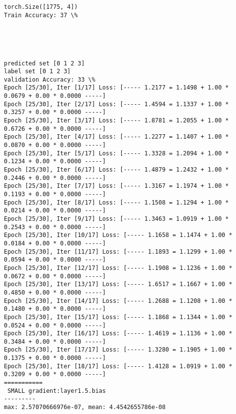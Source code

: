 \documentclass[11pt]{article}
\begin{document}
    \begin{Verbatim}[commandchars=\\\{\}]
torch.Size([1775, 4])
Train Accuracy: 37 \%

    \end{Verbatim}

    \begin{center}
    \end{center}
    { \hspace*{\fill} \\}
    
    \begin{center}
    \end{center}
    { \hspace*{\fill} \\}
    
    \begin{Verbatim}[commandchars=\\\{\}]
predicted set [0 1 2 3]
label set [0 1 2 3]
validation Accuracy: 33 \%
Epoch [25/30], Iter [1/17] Loss: [----- 1.2177 = 1.1498 + 1.00 * 0.0679 + 0.00 * 0.0000 -----]
Epoch [25/30], Iter [2/17] Loss: [----- 1.4594 = 1.1337 + 1.00 * 0.3257 + 0.00 * 0.0000 -----]
Epoch [25/30], Iter [3/17] Loss: [----- 1.8781 = 1.2055 + 1.00 * 0.6726 + 0.00 * 0.0000 -----]
Epoch [25/30], Iter [4/17] Loss: [----- 1.2277 = 1.1407 + 1.00 * 0.0870 + 0.00 * 0.0000 -----]
Epoch [25/30], Iter [5/17] Loss: [----- 1.3328 = 1.2094 + 1.00 * 0.1234 + 0.00 * 0.0000 -----]
Epoch [25/30], Iter [6/17] Loss: [----- 1.4879 = 1.2432 + 1.00 * 0.2446 + 0.00 * 0.0000 -----]
Epoch [25/30], Iter [7/17] Loss: [----- 1.3167 = 1.1974 + 1.00 * 0.1193 + 0.00 * 0.0000 -----]
Epoch [25/30], Iter [8/17] Loss: [----- 1.1508 = 1.1294 + 1.00 * 0.0214 + 0.00 * 0.0000 -----]
Epoch [25/30], Iter [9/17] Loss: [----- 1.3463 = 1.0919 + 1.00 * 0.2543 + 0.00 * 0.0000 -----]
Epoch [25/30], Iter [10/17] Loss: [----- 1.1658 = 1.1474 + 1.00 * 0.0184 + 0.00 * 0.0000 -----]
Epoch [25/30], Iter [11/17] Loss: [----- 1.1893 = 1.1299 + 1.00 * 0.0594 + 0.00 * 0.0000 -----]
Epoch [25/30], Iter [12/17] Loss: [----- 1.1908 = 1.1236 + 1.00 * 0.0672 + 0.00 * 0.0000 -----]
Epoch [25/30], Iter [13/17] Loss: [----- 1.6517 = 1.1667 + 1.00 * 0.4850 + 0.00 * 0.0000 -----]
Epoch [25/30], Iter [14/17] Loss: [----- 1.2688 = 1.1208 + 1.00 * 0.1480 + 0.00 * 0.0000 -----]
Epoch [25/30], Iter [15/17] Loss: [----- 1.1868 = 1.1344 + 1.00 * 0.0524 + 0.00 * 0.0000 -----]
Epoch [25/30], Iter [16/17] Loss: [----- 1.4619 = 1.1136 + 1.00 * 0.3484 + 0.00 * 0.0000 -----]
Epoch [25/30], Iter [17/17] Loss: [----- 1.3280 = 1.1905 + 1.00 * 0.1375 + 0.00 * 0.0000 -----]
Epoch [25/30], Iter [18/17] Loss: [----- 1.4128 = 1.0919 + 1.00 * 0.3209 + 0.00 * 0.0000 -----]
===========
 SMALL gradient:layer1.5.bias
---------
max: 2.57070666976e-07, mean: 4.4542655786e-08

    \end{Verbatim}
\end{document}
